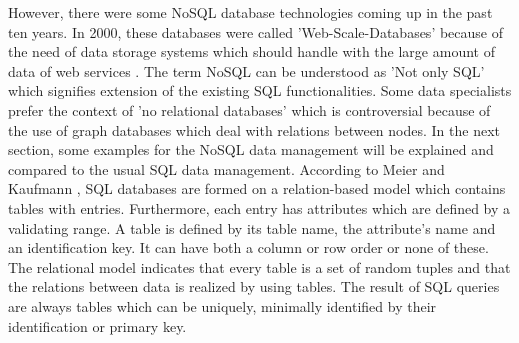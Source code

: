 However, there were some NoSQL database technologies coming up in the past ten years. In 2000, these databases were called 'Web-Scale-Databases' because of the need of data storage systems which should handle with the large amount of data of web services \cite[p.221 ff.]{nosql_meier}.
The term NoSQL can be understood as 'Not only SQL' which signifies extension of the existing SQL functionalities. Some data specialists prefer the context of 'no relational databases' which is controversial because of the use of graph databases which deal with relations between nodes.   
In the next section, some examples for the NoSQL data management will be explained and compared to the usual SQL data management. According to Meier and Kaufmann \cite[p.3 ff.]{nosql_meier}, SQL databases are formed on a relation-based model which contains tables with entries. Furthermore, each entry has attributes which are defined by a validating range. A table is defined by its table name, the attribute's name and an identification key. It can have both a column or row order or none of these. The relational model indicates that every table is a set of random tuples and that the relations between data is realized by using tables. The result of SQL queries are always tables which can be uniquely, minimally identified by their identification or primary key.

